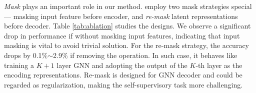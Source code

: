 {\begin{table}[htbp]

\end{table}



 \textit{Mask} plays an important role in our method. \model employ two mask strategies special --- masking input feature before encoder, and \textit{re-mask} latent representations before decoder. Table \ref{tab:ablation} studies the designs. We observe a significant drop in performance if without masking input features, indicating that input masking is vital to avoid trivial solution. For the re-mask strategy, the accuracy drops by 0.1\%$\sim$2.9\% if removing the operation. In such case, it behaves like training a $K+1$ layer GNN and adopting the output of the $K$-th layer as the encoding representations. Re-mask is designed for GNN decoder and could be regarded as regularization, making the self-supervisory task more challenging.



}
